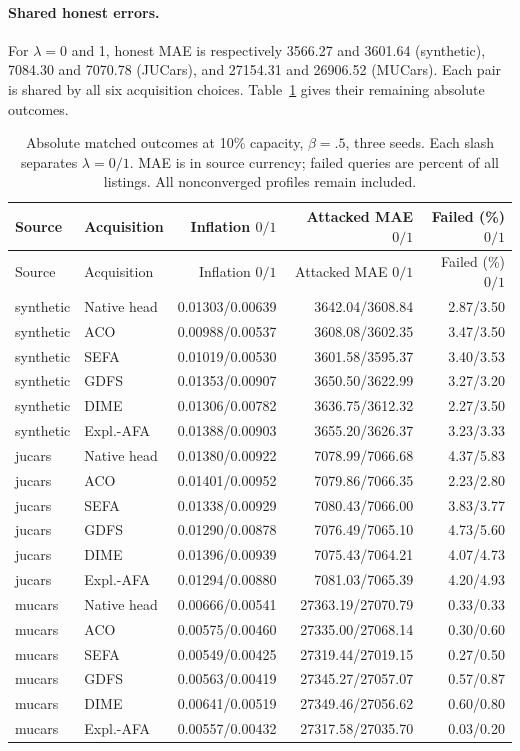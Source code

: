 \documentclass[11pt]{article}
\begin{document}
\paragraph{Shared honest errors.}
For $\lambda=0$ and 1, honest MAE is respectively 3566.27 and 3601.64 (synthetic), 7084.30 and 7070.78 (JUCars), and 27154.31 and 26906.52 (MUCars). Each pair is shared by all six acquisition choices. Table~\ref{tab:recent_primary} gives their remaining absolute outcomes.
\setlength{\LTcapwidth}{\textwidth}
\setlength{\tabcolsep}{4pt}
\begin{longtable}{llrrr}
\caption{Absolute matched outcomes at 10\% capacity, $\beta=.5$, three seeds. Each slash separates $\lambda=0/1$. MAE is in source currency; failed queries are percent of all listings. All nonconverged profiles remain included.}\label{tab:recent_primary}\\
\toprule Source & Acquisition & Inflation $0/1$ & Attacked MAE $0/1$ & Failed (\%) $0/1$\\\midrule\endfirsthead
\toprule Source & Acquisition & Inflation $0/1$ & Attacked MAE $0/1$ & Failed (\%) $0/1$\\\midrule\endhead
synthetic & Native head & 0.01303/0.00639 & 3642.04/3608.84 & 2.87/3.50\\
synthetic & ACO & 0.00988/0.00537 & 3608.08/3602.35 & 3.47/3.50\\
synthetic & SEFA & 0.01019/0.00530 & 3601.58/3595.37 & 3.40/3.53\\
synthetic & GDFS & 0.01353/0.00907 & 3650.50/3622.99 & 3.27/3.20\\
synthetic & DIME & 0.01306/0.00782 & 3636.75/3612.32 & 2.27/3.50\\
synthetic & Expl.-AFA & 0.01388/0.00903 & 3655.20/3626.37 & 3.23/3.33\\
\midrule
jucars & Native head & 0.01380/0.00922 & 7078.99/7066.68 & 4.37/5.83\\
jucars & ACO & 0.01401/0.00952 & 7079.86/7066.35 & 2.23/2.80\\
jucars & SEFA & 0.01338/0.00929 & 7080.43/7066.00 & 3.83/3.77\\
jucars & GDFS & 0.01290/0.00878 & 7076.49/7065.10 & 4.73/5.60\\
jucars & DIME & 0.01396/0.00939 & 7075.43/7064.21 & 4.07/4.73\\
jucars & Expl.-AFA & 0.01294/0.00880 & 7081.03/7065.39 & 4.20/4.93\\
\midrule
mucars & Native head & 0.00666/0.00541 & 27363.19/27070.79 & 0.33/0.33\\
mucars & ACO & 0.00575/0.00460 & 27335.00/27068.14 & 0.30/0.60\\
mucars & SEFA & 0.00549/0.00425 & 27319.44/27019.15 & 0.27/0.50\\
mucars & GDFS & 0.00563/0.00419 & 27345.27/27057.07 & 0.57/0.87\\
mucars & DIME & 0.00641/0.00519 & 27349.46/27056.62 & 0.60/0.80\\
mucars & Expl.-AFA & 0.00557/0.00432 & 27317.58/27035.70 & 0.03/0.20\\
\bottomrule\end{longtable}
\end{document}
